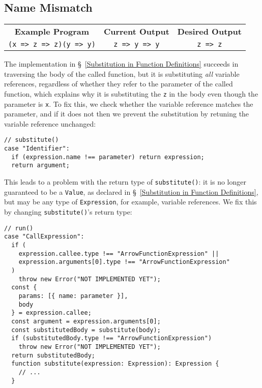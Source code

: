 \documentclass[12pt, oneside]{book}
\begin{document}
\subsection{Name Mismatch}

\begin{center}
\begin{tabular}{c|c|c}
\textbf{Example Program} & \textbf{Current Output} & \textbf{Desired Output} \\
\texttt{(x => z => z)(y => y)} & \texttt{z => y => y} & \texttt{z => z} \\
\end{tabular}
\end{center}

\noindent The implementation in §~\ref{Substitution in Function Definitions} succeeds in traversing the body of the called function, but it is substituting \emph{all} variable references, regardless of whether they refer to the parameter of the called function, which explains why it is substituting the \texttt{z} in the body even though the parameter is \texttt{x}. To fix this, we check whether the variable reference matches the parameter, and if it does not then we prevent the substitution by retuning the variable reference unchanged:

\begin{verbatim}
// substitute()
case "Identifier":
  if (expression.name !== parameter) return expression;
  return argument;
\end{verbatim}

This leads to a problem with the return type of \texttt{substitute()}: it is no longer guaranteed to be a \texttt{Value}, as declared in §~\ref{Substitution in Function Definitions}, but may be any type of \texttt{Expression}, for example, variable references. We fix this by changing \texttt{substitute()}’s return type:

\begin{verbatim}
// run()
case "CallExpression":
  if (
    expression.callee.type !== "ArrowFunctionExpression" ||
    expression.arguments[0].type !== "ArrowFunctionExpression"
  )
    throw new Error("NOT IMPLEMENTED YET");
  const {
    params: [{ name: parameter }],
    body
  } = expression.callee;
  const argument = expression.arguments[0];
  const substitutedBody = substitute(body);
  if (substitutedBody.type !== "ArrowFunctionExpression")
    throw new Error("NOT IMPLEMENTED YET");
  return substitutedBody;
  function substitute(expression: Expression): Expression {
    // ...
  }
\end{verbatim}
\end{document}
